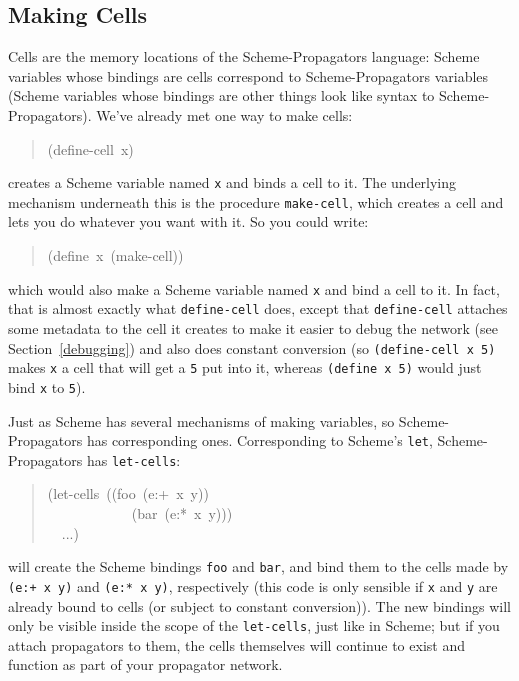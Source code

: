 \documentclass[12pt,letterpaper,english]{article}
\begin{document}
\subsection{Making Cells}
\label{making-cells}

Cells are the memory locations of the Scheme-Propagators
language: Scheme variables whose bindings are cells correspond to
Scheme-Propagators variables (Scheme variables whose bindings are
other things look like syntax to Scheme-Propagators).  We've
already met one way to make cells:
\begin{quote}{\ttfamily \raggedright \noindent
(define-cell~x)
}\end{quote}
creates a Scheme variable named \texttt{x} and binds a cell to it.  The
underlying mechanism underneath this is the procedure \texttt{make-cell},
which creates a cell and lets you do whatever you want with it.  So
you could write:
\begin{quote}{\ttfamily \raggedright \noindent
(define~x~(make-cell))
}\end{quote}
which would also make a Scheme variable named \texttt{x} and bind a cell to
it.  In fact, that is almost exactly what \texttt{define-cell} does, except
that \texttt{define-cell} attaches some metadata to the cell it creates to
make it easier to debug the network (see Section~\ref{debugging})
and also does constant
conversion (so \texttt{(define-cell x 5)} makes \texttt{x} a cell that will get
a \texttt{5} put into it, whereas \texttt{(define x 5)} would just bind \texttt{x} to
\texttt{5}).

Just as Scheme has several mechanisms of making variables, so
Scheme-Propagators has corresponding ones.  Corresponding to Scheme's
\texttt{let}, Scheme-Propagators has \texttt{let-cells}:
\begin{quote}{\ttfamily \raggedright \noindent
(let-cells~((foo~(e:+~x~y))~\\
~~~~~~~~~~~~(bar~(e:*~x~y)))~\\
~~...)
}\end{quote}
will create the Scheme bindings \texttt{foo} and \texttt{bar}, and bind them to
the cells made by \texttt{(e:+ x y)} and \texttt{(e:* x y)}, respectively (this
code is only sensible if \texttt{x} and \texttt{y} are already bound to cells
(or subject to constant conversion)).  The new bindings will only be
visible inside the scope of the \texttt{let-cells}, just like in Scheme;
but if you attach propagators to them, the cells themselves will
continue to exist and function as part of your propagator network.
\end{document}
